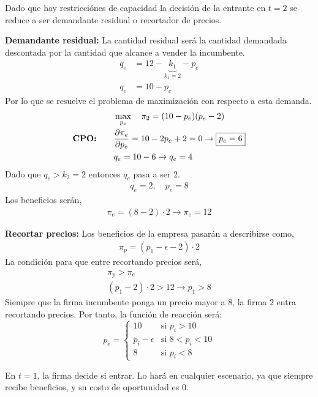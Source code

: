 \documentclass{exam}
\begin{document}
\begin{solution}
    Dado que hay restricciónes de capacidad la decisión de la entrante en $t = 2$ se reduce a ser demandante residual o recortador de precios. 

    \noindent
\begin{minipage}{0.45\textwidth}
    \textbf{Demandante residual:}\newline
    La cantidad residual será la cantidad demandada descontada por la cantidad que alcance a vender la incumbente. 
    \begin{align*}
        q_e &= 12 - \underbrace{k_1}_{k_1 = 2} - p_e \\
        q_e &= 10 - p_e 
    \end{align*}
    Por lo que se resuelve el problema de maximización con respecto a esta demanda. 
    \begin{align*}
        &\max_{p_e} \quad \pi_2 = (10-p_e)(p_e-2) \\
        \textbf{CPO:} \qquad &\pdv{\pi_e}{p_e} = 10-2p_e + 2 = 0 \rightarrow \boxed{p_e = 6}\\
        &q_e = 10 - 6 \to q_e = 4
    \end{align*}
    Dado que $q_e > k_2 = 2$ entonces $q_e$ pasa a ser 2. 
    \begin{align*}
        \boxed{q_e = 2, \quad p_e = 8}
    \end{align*}
    Los beneficios serán, 
    \begin{align*}
        \pi_e = (8-2)\cdot 2 \to \boxed{\pi_e = 12}
    \end{align*}
\end{minipage}%
\hfill%
\vrule width 1pt
\hfill%
\begin{minipage}{0.45\textwidth}
    \textbf{Recortar precios:}\newline
    Los beneficios de la empresa pasarán a describirse como,
    \begin{align*}
        \pi_p = (p_1-\epsilon -2) \cdot 2
    \end{align*}
    La condición para que entre recortando precios será,
    \begin{align*}
        \pi_p > \pi_e \\
        (p_1 - 2) \cdot 2 > 12 \to \boxed{p_1 > 8}
    \end{align*}
    Siempre que la firma incumbente ponga un precio mayor a $8$, la firma $2$ entra recortando precios. Por tanto, la función de reacción será:
    \[
        p_e =
        \begin{cases} 
        10 & \text{si } p_i > 10 \\
        p_i - \epsilon & \text{si } 8 < p_i < 10 \\
        8 & \text{si } p_i < 8
        \end{cases}
    \]
\end{minipage}
\vspace{3mm}
En \(t = 1\), la firma decide si entrar. Lo hará en cualquier escenario, ya que siempre recibe beneficios, y su costo de oportunidad es $0$.

\end{solution}
\end{document}
